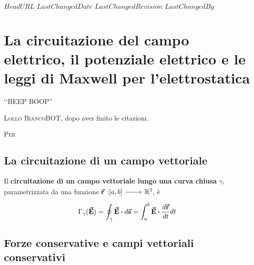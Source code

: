 \svnidlong
{$HeadURL$}
{$LastChangedDate$}
{$LastChangedRevision$}
{$LastChangedBy$}

\chapter{La circuitazione del campo elettrico, il potenziale elettrico e le leggi di Maxwell per l'elettrostatica} %
\begin{introduction}
	‘‘BEEP BOOP''
	\begin{flushright}
		\textsc{Lollo BiancoBOT}, dopo aver finito le citazioni. %
	\end{flushright}
\end{introduction}
\lettrine[findent=1pt, nindent=0pt]{P}{er}  %
\section{La circuitazione di un campo vettoriale}
\begin{define}
	Il \textbf{circuitazione di un campo vettoriale lungo una curva chiusa} $\gamma$, parametrizzata da una funzione $\funz[\vba{r}]{\left[a,b\right]}{\realset^3}$, è
	\begin{equation}
		\Gamma_{\gamma}(\vba{E})=\oint_{\gamma}\vba{E}\vdot d\vba{s}=\int_{a}^b\vba{E}\vdot\frac{d\vba{r}}{dt}dt
	\end{equation}
\end{define}
\section{Forze conservative e campi vettoriali conservativi}
